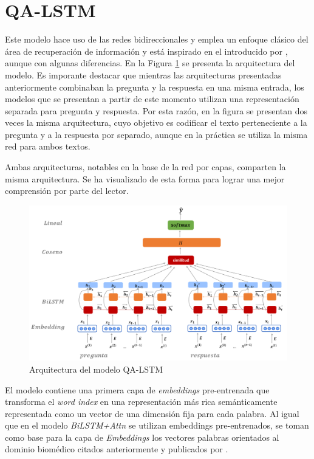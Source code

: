 \section{QA-LSTM}

Este modelo hace uso de las redes bidireccionales y emplea un enfoque clásico del área de recuperación de información y está inspirado en el introducido por \cite{2015-tan-qalstm}, aunque con algunas diferencias. En la Figura \ref{lstm_qa} se presenta la arquitectura del modelo. Es imporante destacar que mientras las arquitecturas presentadas anteriormente combinaban la pregunta y la respuesta en una misma entrada, los modelos que se presentan a partir de este momento utilizan una representación separada para pregunta y respuesta. Por esta razón, en la figura se presentan dos veces la misma arquitectura, cuyo objetivo es codificar el texto perteneciente a la pregunta y a la respuesta por separado, aunque en la práctica se utiliza la misma red para ambos textos.

Ambas arquitecturas, notables en la base de la red por capas, comparten la misma arquitectura. Se ha visualizado de esta forma para lograr una mejor comprensión por parte del lector.

\begin{figure}[!tb]
  \begin{center}
    \includegraphics[angle=0, width=1\textwidth]{Graphics/lstm_qa.png}
  \end{center}
    \caption{Arquitectura del modelo QA-LSTM}\label{lstm_qa}
\end{figure}

El modelo contiene una primera capa de \textit{embeddings} pre-entrenada que transforma el \textit{word index} en una representación más rica semánticamente representada como un vector de una dimensión fija para cada palabra. Al igual que en el modelo \textit{BiLSTM+Attn} se utilizan embeddings pre-entrenados, se toman como base para la capa de \textit{Embeddings} los vectores palabras orientados al dominio biomédico citados anteriormente y publicados por \cite{2019-medical-fastext}.

